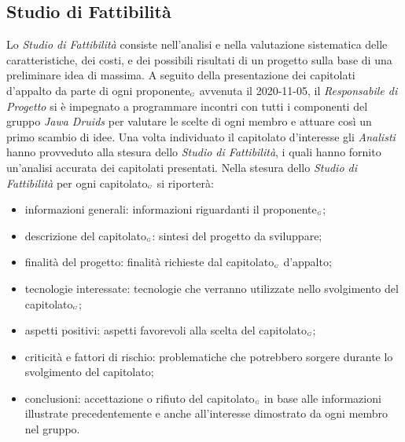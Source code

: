 \subsection{Studio di Fattibilità}\label{ProcessiPrimariFornituraStudioDiFattibilità}
Lo \textit{Studio di Fattibilità} consiste nell'analisi e nella valutazione sistematica delle caratteristiche, dei costi, e dei possibili risultati di un progetto sulla base di una preliminare idea di massima.
A seguito della presentazione dei capitolati d'appalto da parte di ogni proponente$_{\scaleto{G}{3pt}}$ avvenuta il 2020-11-05, il \textit{Responsabile di Progetto} si è impegnato a programmare incontri con tutti i componenti del gruppo \textit{Jawa Druids} per valutare le scelte di ogni membro e attuare così un primo scambio di idee. Una volta individuato il capitolato d'interesse gli \textit{Analisti} hanno provveduto alla stesura dello \textit{Studio di Fattibilità}, i quali hanno fornito un'analisi accurata dei capitolati presentati.
Nella stesura dello \textit{Studio di Fattibilità} per ogni capitolato$_{\scaleto{G}{3pt}}$ si riporterà:
\begin{itemize}
	\item informazioni generali: informazioni riguardanti il proponente$_{\scaleto{G}{3pt}}$;
	\item descrizione del capitolato$_{\scaleto{G}{3pt}}$: sintesi del progetto da sviluppare;
	\item finalità del progetto: finalità richieste dal capitolato$_{\scaleto{G}{3pt}}$ d'appalto;
	\item tecnologie interessate: tecnologie che verranno utilizzate nello svolgimento del capitolato$_{\scaleto{G}{3pt}}$;
	\item aspetti positivi: aspetti favorevoli alla scelta del capitolato$_{\scaleto{G}{3pt}}$;
	\item criticità e fattori di rischio: problematiche che potrebbero sorgere durante lo svolgimento del capitolato;
	\item conclusioni: accettazione o rifiuto del capitolato$_{\scaleto{G}{3pt}}$ in base alle informazioni illustrate precedentemente e anche all'interesse dimostrato da ogni membro nel gruppo.
\end{itemize}
